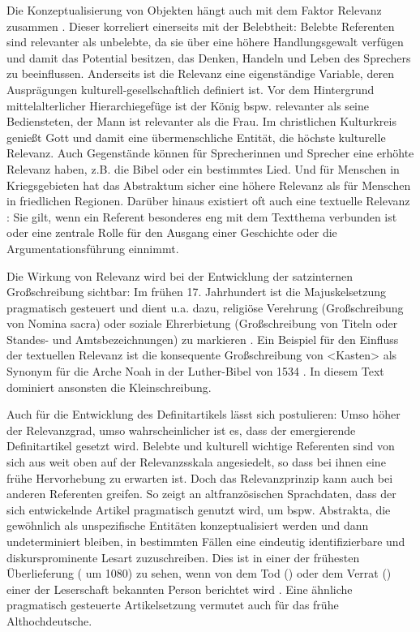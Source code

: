 Die Konzeptualisierung von Objekten hängt auch mit dem Faktor Relevanz zusammen \parencite[s.][347]{Szczepaniak2011}.  
Dieser korreliert einerseits mit der Belebtheit: Belebte Referenten sind relevanter als unbelebte, da sie  über eine höhere Handlungsgewalt verfügen und damit das Potential besitzen, das Denken, Handeln und Leben des Sprechers zu beeinflussen. Anderseits ist die Relevanz eine eigenständige Variable, deren Ausprägungen kulturell-gesellschaftlich definiert ist. Vor dem Hintergrund mittelalterlicher Hierarchiegefüge ist der König bspw. relevanter als seine Bediensteten, der Mann ist relevanter als die Frau. Im christlichen Kulturkreis genießt Gott und damit eine übermenschliche Entität, die höchste kulturelle Relevanz. Auch Gegenstände können für Sprecherinnen und Sprecher eine erhöhte Relevanz haben, z.B. die Bibel oder ein bestimmtes Lied. Und für Menschen in Kriegsgebieten hat das Abstraktum  sicher eine höhere Relevanz als für Menschen in friedlichen Regionen.  Darüber hinaus existiert oft auch eine textuelle Relevanz  \parencite[347]{Szczepaniak2011}: Sie gilt, wenn ein Referent besonderes eng mit dem Textthema verbunden ist oder eine zentrale Rolle für den Ausgang einer Geschichte oder die Argumentationsführung einnimmt.

Die Wirkung von Relevanz wird bei der Entwicklung der satzinternen Großschreibung sichtbar: Im frühen 17. Jahrhundert ist die Majuskelsetzung pragmatisch gesteuert und dient u.a. dazu, religiöse Verehrung (Großschreibung von Nomina sacra) oder soziale Ehrerbietung  (Großschreibung von Titeln oder Standes- und Amtsbezeichnungen) zu markieren \parencite[73]{Bergmann1999}. Ein Beispiel für den Einfluss der textuellen Relevanz ist die konsequente Großschreibung von  <Kasten> als Synonym für die Arche Noah in der Luther-Bibel von 1534 \parencite[352]{Szczepaniak2011}. In diesem Text dominiert ansonsten die Kleinschreibung.

Auch für die Entwicklung des Definitartikels lässt sich postulieren: Umso höher der Relevanzgrad, umso wahrscheinlicher ist es, dass der emergierende Definitartikel gesetzt wird. Belebte und kulturell wichtige Referenten sind von sich aus weit oben auf der Relevanzsskala angesiedelt, so dass bei ihnen eine frühe Hervorhebung zu erwarten ist. 
Doch das Relevanzprinzip kann auch bei anderen Referenten greifen. So zeigt \textcite[]{Epstein1993,Epstein1994} an altfranzösischen Sprachdaten, dass der sich entwickelnde Artikel pragmatisch genutzt wird, um bspw. Abstrakta, die gewöhnlich als unspezifische Entitäten konzeptualisiert werden und dann undeterminiert bleiben, in bestimmten Fällen eine eindeutig identifizierbare und diskursprominente Lesart zuzuschreiben. Dies ist in einer der frühesten Überlieferung  ( um 1080) zu sehen, wenn von dem Tod () oder dem Verrat () einer der Leserschaft bekannten Person berichtet wird \parencite[71f.]{Epstein1994}. Eine ähnliche pragmatisch gesteuerte Artikelsetzung vermutet auch \textcite[218]{Oubouzar1989} für das frühe Althochdeutsche. 

